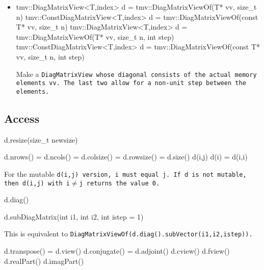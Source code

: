 \begin{itemize}
\item
\begin{tmvcode}
tmv::DiagMatrixView<T,index> d = 
      tmv::DiagMatrixViewOf(T* vv, size_t n)
tmv::ConstDiagMatrixView<T,index> d = 
      tmv::DiagMatrixViewOf(const T* vv, size_t n)
tmv::DiagMatrixView<T,index> d = 
      tmv::DiagMatrixViewOf(T* vv, size_t n, int step)
tmv::ConstDiagMatrixView<T,index> d = 
      tmv::DiagMatrixViewOf(const T* vv, size_t n, int step)
\end{tmvcode}
Make a \tt{DiagMatrixView} whose diagonal consists of the actual memory elements \tt{vv}.  The last two allow for a non-unit step between the elements.

\end{itemize}


\subsection{Access}
\label{DiagMatrix_Access}

\begin{tmvcode}
d.resize(size_t newsize)
\end{tmvcode}

\begin{tmvcode}
d.nrows() = d.ncols() = d.colsize() = d.rowsize() = d.size()
d(i,j)
d(i) = d(i,i)
\end{tmvcode}
For the mutable \tt{d(i,j)} version, 
\tt{i} must equal \tt{j}.
If \tt{d} is not mutable, then \tt{d(i,j)} with \tt{i}$\neq$\tt{j} returns the 
value 0.

\begin{tmvcode}
d.diag()
\end{tmvcode}

\begin{tmvcode}
d.subDiagMatrix(int i1, int i2, int istep = 1)
\end{tmvcode}
This is equivalent to \tt{DiagMatrixViewOf(d.diag().subVector(i1,i2,istep))}.
\begin{tmvcode}
d.transpose() = d.view()
d.conjugate() = d.adjoint()
d.cview()
d.fview()
d.realPart()
d.imagPart()
\end{tmvcode}

